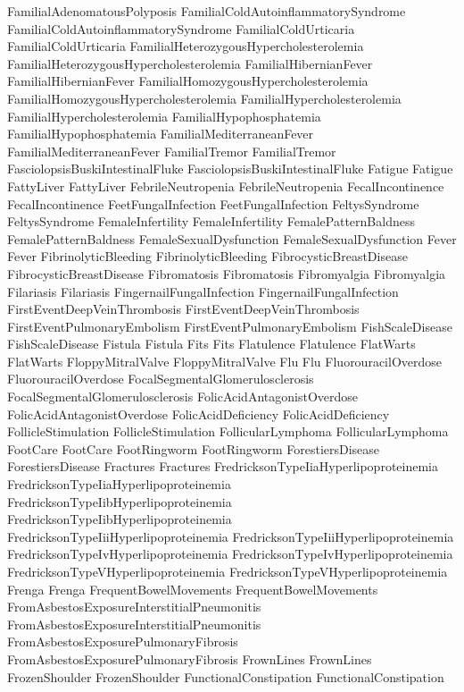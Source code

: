  FamilialAdenomatousPolyposis
 FamilialColdAutoinflammatorySyndrome
 FamilialColdAutoinflammatorySyndrome
 FamilialColdUrticaria
 FamilialColdUrticaria
 FamilialHeterozygousHypercholesterolemia
 FamilialHeterozygousHypercholesterolemia
 FamilialHibernianFever
 FamilialHibernianFever
 FamilialHomozygousHypercholesterolemia
 FamilialHomozygousHypercholesterolemia
 FamilialHypercholesterolemia
 FamilialHypercholesterolemia
 FamilialHypophosphatemia
 FamilialHypophosphatemia
 FamilialMediterraneanFever
 FamilialMediterraneanFever
 FamilialTremor
 FamilialTremor
 FasciolopsisBuskiIntestinalFluke
 FasciolopsisBuskiIntestinalFluke
 Fatigue
 Fatigue
 FattyLiver
 FattyLiver
 FebrileNeutropenia
 FebrileNeutropenia
 FecalIncontinence
 FecalIncontinence
 FeetFungalInfection
 FeetFungalInfection
 FeltysSyndrome
 FeltysSyndrome
 FemaleInfertility
 FemaleInfertility
 FemalePatternBaldness
 FemalePatternBaldness
 FemaleSexualDysfunction
 FemaleSexualDysfunction
 Fever
 Fever
 FibrinolyticBleeding
 FibrinolyticBleeding
 FibrocysticBreastDisease
 FibrocysticBreastDisease
 Fibromatosis
 Fibromatosis
 Fibromyalgia
 Fibromyalgia
 Filariasis
 Filariasis
 FingernailFungalInfection
 FingernailFungalInfection
 FirstEventDeepVeinThrombosis
 FirstEventDeepVeinThrombosis
 FirstEventPulmonaryEmbolism
 FirstEventPulmonaryEmbolism
 FishScaleDisease
 FishScaleDisease
 Fistula
 Fistula
 Fits
 Fits
 Flatulence
 Flatulence
 FlatWarts
 FlatWarts
 FloppyMitralValve
 FloppyMitralValve
 Flu
 Flu
 FluorouracilOverdose
 FluorouracilOverdose
 FocalSegmentalGlomerulosclerosis
 FocalSegmentalGlomerulosclerosis
 FolicAcidAntagonistOverdose
 FolicAcidAntagonistOverdose
 FolicAcidDeficiency
 FolicAcidDeficiency
 FollicleStimulation
 FollicleStimulation
 FollicularLymphoma
 FollicularLymphoma
 FootCare
 FootCare
 FootRingworm
 FootRingworm
 ForestiersDisease
 ForestiersDisease
 Fractures
 Fractures
 FredricksonTypeIiaHyperlipoproteinemia
 FredricksonTypeIiaHyperlipoproteinemia
 FredricksonTypeIibHyperlipoproteinemia
 FredricksonTypeIibHyperlipoproteinemia
 FredricksonTypeIiiHyperlipoproteinemia
 FredricksonTypeIiiHyperlipoproteinemia
 FredricksonTypeIvHyperlipoproteinemia
 FredricksonTypeIvHyperlipoproteinemia
 FredricksonTypeVHyperlipoproteinemia
 FredricksonTypeVHyperlipoproteinemia
 Frenga
 Frenga
 FrequentBowelMovements
 FrequentBowelMovements
 FromAsbestosExposureInterstitialPneumonitis
 FromAsbestosExposureInterstitialPneumonitis
 FromAsbestosExposurePulmonaryFibrosis
 FromAsbestosExposurePulmonaryFibrosis
 FrownLines
 FrownLines
 FrozenShoulder
 FrozenShoulder
 FunctionalConstipation
 FunctionalConstipation
